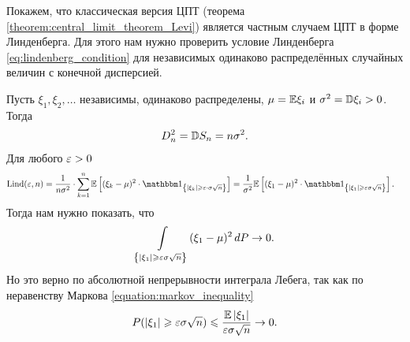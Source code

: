 \documentclass[../main.tex]{subfiles}
\begin{document}
\begin{remrk}
 Покажем, что классическая версия ЦПТ (теорема \ref{theorem:central_limit_theorem_Levi}) является частным случаем ЦПТ в форме Линденберга. Для этого нам нужно проверить условие Линденберга \eqref{eq:lindenberg_condition} для независимых одинаково распределённых случайных величин с конечной дисперсией.

 Пусть $ \xi_1, \xi_2, \ldots $ независимы, одинаково распределены, $ \mu = \mathbb E \xi_i $ и $ \sigma^{2} = \mathbb D \xi_i > 0 $. Тогда
 \begin{align*}
  D_n^{2} = \mathbb D S_n = n\sigma^{2}.
 \end{align*} Для любого $ \varepsilon > 0 $
 \begin{align*}
  \Lind(\eps,n) &= \frac{1}{n\sigma^{2}} \cdot \sum_{k=1}^{n}\E \left[ (\xi_k-\mu)^{2} \cdot \Ind_{\left\{ \left| \xi_k \right| \geqslant \eps \cdot \sigma \sqrt n \right\}} \right] = \frac{1}{\sigma^{2}} \E \left[ (\xi_1 - \mu)^{2} \cdot \Ind_{\left\{ \left| \xi_1 \right| \geqslant \eps\sigma \sqrt n \right\}} \right].
 \end{align*} Тогда нам нужно показать, что
 \begin{align*}
  \int\limits_{\left\{ \left| \xi_1 \right| \geqslant \varepsilon \sigma \sqrt n \right\}}  (\xi_1-\mu)^{2}\,dP \to 0.
 \end{align*} Но это верно по абсолютной непрерывности интеграла Лебега, так как по неравенству Маркова \eqref{equation:markov_inequality}
 \begin{align*}
  P(\left| \xi_1 \right| \geqslant \varepsilon \sigma \sqrt n) \leqslant \frac{\mathbb E \left| \xi_1 \right|}{\varepsilon \sigma \sqrt n} \to 0.
 \end{align*}
\end{remrk}
\end{document}
